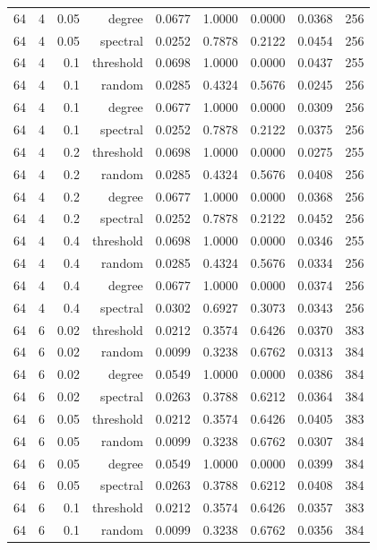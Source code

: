 \begin{table}[t]
\begin{tabular}{lrrrrrrrr}
64 & 4 & 0.05 & degree & 0.0677 & 1.0000 & 0.0000 & 0.0368 & 256 \\
64 & 4 & 0.05 & spectral & 0.0252 & 0.7878 & 0.2122 & 0.0454 & 256 \\
64 & 4 & 0.1 & threshold & 0.0698 & 1.0000 & 0.0000 & 0.0437 & 255 \\
64 & 4 & 0.1 & random & 0.0285 & 0.4324 & 0.5676 & 0.0245 & 256 \\
64 & 4 & 0.1 & degree & 0.0677 & 1.0000 & 0.0000 & 0.0309 & 256 \\
64 & 4 & 0.1 & spectral & 0.0252 & 0.7878 & 0.2122 & 0.0375 & 256 \\
64 & 4 & 0.2 & threshold & 0.0698 & 1.0000 & 0.0000 & 0.0275 & 255 \\
64 & 4 & 0.2 & random & 0.0285 & 0.4324 & 0.5676 & 0.0408 & 256 \\
64 & 4 & 0.2 & degree & 0.0677 & 1.0000 & 0.0000 & 0.0368 & 256 \\
64 & 4 & 0.2 & spectral & 0.0252 & 0.7878 & 0.2122 & 0.0452 & 256 \\
64 & 4 & 0.4 & threshold & 0.0698 & 1.0000 & 0.0000 & 0.0346 & 255 \\
64 & 4 & 0.4 & random & 0.0285 & 0.4324 & 0.5676 & 0.0334 & 256 \\
64 & 4 & 0.4 & degree & 0.0677 & 1.0000 & 0.0000 & 0.0374 & 256 \\
64 & 4 & 0.4 & spectral & 0.0302 & 0.6927 & 0.3073 & 0.0343 & 256 \\
64 & 6 & 0.02 & threshold & 0.0212 & 0.3574 & 0.6426 & 0.0370 & 383 \\
64 & 6 & 0.02 & random & 0.0099 & 0.3238 & 0.6762 & 0.0313 & 384 \\
64 & 6 & 0.02 & degree & 0.0549 & 1.0000 & 0.0000 & 0.0386 & 384 \\
64 & 6 & 0.02 & spectral & 0.0263 & 0.3788 & 0.6212 & 0.0364 & 384 \\
64 & 6 & 0.05 & threshold & 0.0212 & 0.3574 & 0.6426 & 0.0405 & 383 \\
64 & 6 & 0.05 & random & 0.0099 & 0.3238 & 0.6762 & 0.0307 & 384 \\
64 & 6 & 0.05 & degree & 0.0549 & 1.0000 & 0.0000 & 0.0399 & 384 \\
64 & 6 & 0.05 & spectral & 0.0263 & 0.3788 & 0.6212 & 0.0408 & 384 \\
64 & 6 & 0.1 & threshold & 0.0212 & 0.3574 & 0.6426 & 0.0357 & 383 \\
64 & 6 & 0.1 & random & 0.0099 & 0.3238 & 0.6762 & 0.0356 & 384 \\

\end{tabular}
\end{table}
